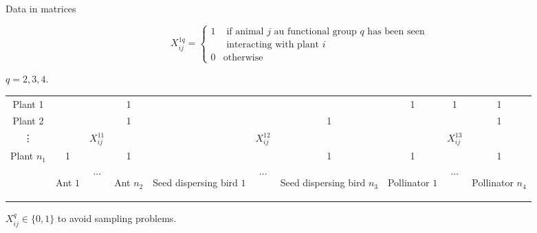 \documentclass[compress,10pt]{beamer}
\begin{document}

\begin{frame}{Data in matrices}

  $$X^{1q}_{ij}=\left\{ \begin{array}{cl}1& \mbox{ if animal  $j$ au functional group $q$ has been seen }\\
  & \mbox{ interacting with plant  $i$ }\\ 0 & \mbox{otherwise}\end{array}\right.$$  

$q=2,3,4$. 
\centering 
\begin{tabular}{|c|ccc|ccc|ccc|}
\hline
 \cellcolor{green!25} Plant 1 &&&1&&&&1&1&1\\
 \cellcolor{green!25} Plant 2 &&&1&&&1&&&1\\
 \cellcolor{green!25} \vdots &&$X^{11}_{ij}$&&&$X^{12}_{ij}$&&&$X^{13}_{ij}$&\\
 \cellcolor{green!25} Plant $n_1$ &1&&1&&&1&1&&1\\
\hline
& \cellcolor{blue!14}  \begin{turn}{-90}Ant $1$\end{turn} &\cellcolor{blue!14} $\cdots$& \cellcolor{blue!14}\begin{turn}{-90}Ant ${n_2}$ \end{turn}&  \cellcolor{red!15} \begin{turn}{-90}\footnotesize Seed dispersing bird  $1$\end{turn}&$\cdots$ \cellcolor{red!15} & \cellcolor{red!15}  \begin{turn}{-90} \footnotesize Seed dispersing bird $n_3$\end{turn} & \cellcolor{yellow!25} \begin{turn}{-90}Pollinator $1$\end{turn}& \cellcolor{yellow!25}  $\cdots$ & \cellcolor{yellow!25}  \begin{turn}{-90}Pollinator $n_4$\end{turn}\\
\hline
\end{tabular}

\vspace{1em}


\footnotesize{$X^q_{ij} \in \{0,1\}$  to avoid sampling problems. } 



\end{frame}
\end{document}
